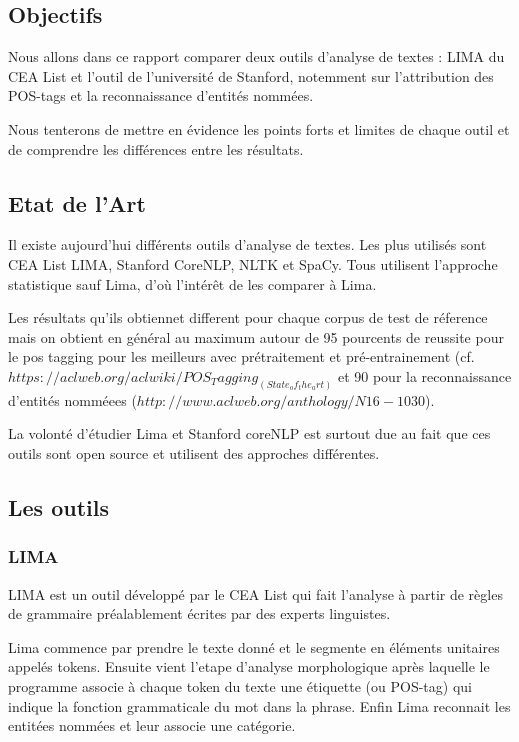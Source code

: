 \documentclass[12pt]{report}
\begin{document}
\subsection{Objectifs}

Nous allons dans ce rapport comparer deux outils d'analyse de textes : LIMA du CEA List et l'outil de l'université de Stanford, notemment sur l'attribution des POS-tags et la reconnaissance d'entités nommées.

Nous tenterons de mettre en évidence les points forts et limites de chaque outil et de comprendre les différences entre les résultats.

\subsection{Etat de l'Art}

Il existe aujourd'hui différents outils d'analyse de textes. Les plus utilisés sont CEA List LIMA, Stanford CoreNLP, NLTK et SpaCy. Tous utilisent l'approche statistique sauf Lima, d'où l'intérêt de les comparer à Lima.

Les résultats qu'ils obtiennet different pour chaque corpus de test de réference mais on obtient en général au maximum autour de 95 pourcents de reussite pour le pos tagging pour les meilleurs avec prétraitement et pré-entrainement (cf.$https://aclweb.org/aclwiki/POS_Tagging_(State_of_the_art)$ et 90 pour la reconnaissance d'entités  nomméees ($http://www.aclweb.org/anthology/N16-1030$).

La volonté d'étudier Lima et Stanford coreNLP est surtout due au fait que ces outils sont open source et utilisent des approches différentes.

\subsection{Les outils}

\subsubsection{LIMA}

LIMA est un outil développé par le CEA List qui fait l'analyse à partir de règles de grammaire préalablement écrites par des experts linguistes.

Lima commence par prendre le texte donné et le segmente en éléments unitaires appelés tokens.
Ensuite vient l'etape d'analyse morphologique après laquelle le programme associe à chaque token du texte une étiquette (ou POS-tag) qui indique la fonction grammaticale du mot dans la phrase.
Enfin Lima reconnait les entitées nommées et leur associe une catégorie.
\end{document}
